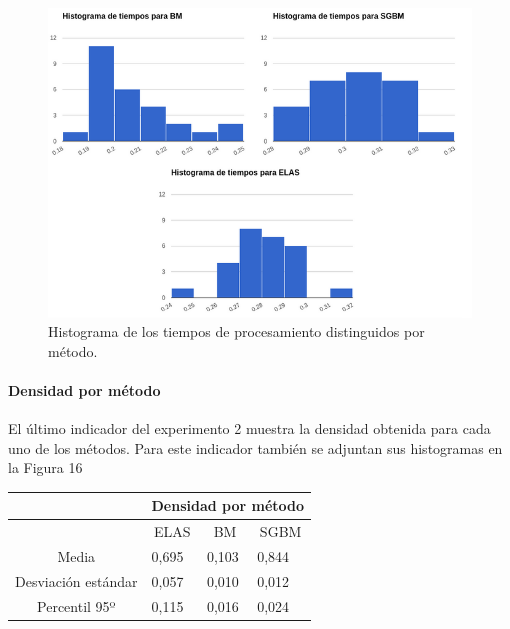 \documentclass[11pt,a4paper,titlepage]{article}
\newcommand{\Figure}[1]{Figura #1}
\begin{document}
\begin{figure}[h!]

  \centering
    \includegraphics[width=1\textwidth]{f15.png}
  \caption{Histograma de los tiempos de procesamiento distinguidos por método.}
\end{figure}

\paragraph{Densidad por método}
\hfill \break

El último indicador del experimento 2 muestra la densidad obtenida para cada uno de los métodos. Para este indicador también se adjuntan sus histogramas en la \Figure{16}

\begin{table}[!ht]
\centering
\begin{tabular}{@{}clll@{}}
& \multicolumn{3}{c}{Densidad por método} \\ \midrule
       & \multicolumn{1}{c}{ELAS} & \multicolumn{1}{c}{BM} & \multicolumn{1}{c}{SGBM} \\ \midrule
Media & 0,695 & 0,103 & 0,844 \\ \midrule
Desviación estándar & 0,057 & 0,010 & 0,012 \\ \midrule
Percentil 95º & 0,115 & 0,016 & 0,024 \\ \midrule
\end{tabular}
\end{table}
\end{document}

